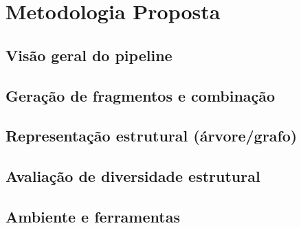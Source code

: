 \chapter{Metodologia Proposta}
\label{cap:metodologia}


\section{Visão geral do pipeline}
\label{sec:visao-geral-pipeline}


\section{Geração de fragmentos e combinação}
\label{sec:etapa-fragmentos}


\section{Representação estrutural (árvore/grafo)}
\label{sec:representacao-estrutural}


\section{Avaliação de diversidade estrutural}
\label{sec:avaliacao-diversidade}


\section{Ambiente e ferramentas}
\label{sec:ambiente-ferramentas}

